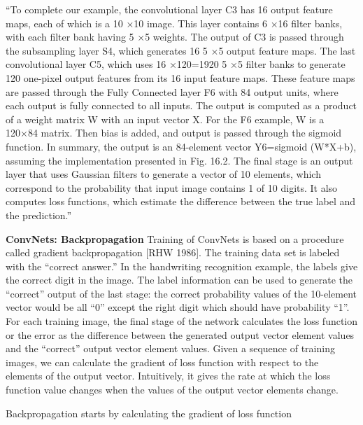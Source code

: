 \documentclass[7pt]{article}
\begin{document}
“To complete our example, the convolutional layer C3 has 16 output feature maps, each of which is a 10 ×10 image. This layer contains 6 ×16 filter banks, with each filter bank having 5 ×5 weights. The output of C3 is passed through the subsampling layer S4, which generates 16 5 ×5 output feature maps. The last convolutional layer C5, which uses 16 ×120=1920 5 ×5 filter banks to generate 120 one-pixel output features from its 16 input feature maps.
These feature maps are passed through the Fully Connected layer F6 with 84 output units, where each output is fully connected to all inputs. The output is computed as a product of a weight matrix W with an input vector X. For the F6 example, W is a 120×84 matrix. Then bias is added, and output is passed through the sigmoid function. In summary, the output is an 84-element vector Y6=sigmoid (W*X+b), assuming the implementation presented in Fig. 16.2.
The final stage is an output layer that uses Gaussian filters to generate a vector of 10 elements, which correspond to the probability that input image contains 1 of 10 digits. It also computes loss functions, which estimate the difference between the true label and the prediction.”


\textbf{ConvNets: Backpropagation}
Training of ConvNets is based on a procedure called gradient backpropagation [RHW 1986]. The training data set is labeled with the “correct answer.” In the handwriting recognition example, the labels give the correct digit in the image. The label information can be used to generate the “correct” output of the last stage: the correct probability values of the 10-element vector would be all “0” except the right digit which should have probability “1”.
For each training image, the final stage of the network calculates the loss function or the error as the difference between the generated output vector element values and the “correct” output vector element values. Given a sequence of training images, we can calculate the gradient of loss function with respect to the elements of the output vector. Intuitively, it gives the rate at which the loss function value changes when the values of the output vector elements change.

Backpropagation starts by calculating the gradient of loss function %
\end{document}
